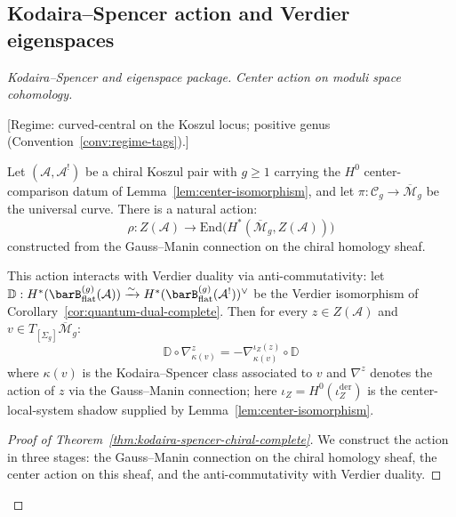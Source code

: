 \subsection{Kodaira--Spencer action and Verdier eigenspaces}

\begin{proof}[Kodaira--Spencer and eigenspace package]

\emph{Center action on moduli space cohomology.}

\begin{theorem}
\label{thm:kodaira-spencer-chiral-complete}
\textup{[Regime: curved-central on the Koszul locus; positive genus
\textup{(}Convention~\textup{\ref{conv:regime-tags})}.]}

Let $(\mathcal{A}, \mathcal{A}^!)$ be a chiral Koszul pair with
$g \geq 1$ carrying the $H^0$ center-comparison datum of
Lemma~\textup{\ref{lem:center-isomorphism}}, and let $\pi: \mathcal{C}_g
\to \overline{\mathcal{M}}_g$ be the universal curve. There is a natural action:
\begin{equation}
\rho: Z(\mathcal{A}) \to \mathrm{End}\bigl(H^*(\overline{\mathcal{M}}_g, Z(\mathcal{A}))\bigr)
\end{equation}
constructed from the Gauss--Manin connection on the chiral homology sheaf.

This action interacts with Verdier duality via anti-commutativity: let
$\mathbb{D}: H^*(\barB^{(g)}_{\mathrm{flat}}(\mathcal{A})) \xrightarrow{\sim}
H^*(\barB^{(g)}_{\mathrm{flat}}(\mathcal{A}^!))^\vee$ be the Verdier
isomorphism of Corollary~\ref{cor:quantum-dual-complete}.
Then for every $z \in Z(\mathcal{A})$ and $v \in T_{[\Sigma_g]}\overline{\mathcal{M}}_g$:
\begin{equation}\label{eq:verdier-ks-anticommute}
\mathbb{D} \circ \nabla_{\kappa(v)}^z =
-\nabla_{\kappa(v)}^{\iota_Z(z)} \circ \mathbb{D}
\end{equation}
where $\kappa(v)$ is the Kodaira--Spencer class associated to $v$ and $\nabla^z$
denotes the action of $z$ via the Gauss--Manin connection; here
\(\iota_Z=H^0(\iota_Z^{\mathrm{der}})\) is the center-local-system
shadow supplied by Lemma~\textup{\ref{lem:center-isomorphism}}.
\end{theorem}

\begin{proof}[Proof of Theorem~\ref{thm:kodaira-spencer-chiral-complete}]
We construct the action in three stages: the Gauss--Manin connection on the chiral
homology sheaf, the center action on this sheaf, and the anti-commutativity with
Verdier duality.


\end{proof}
\end{proof}
